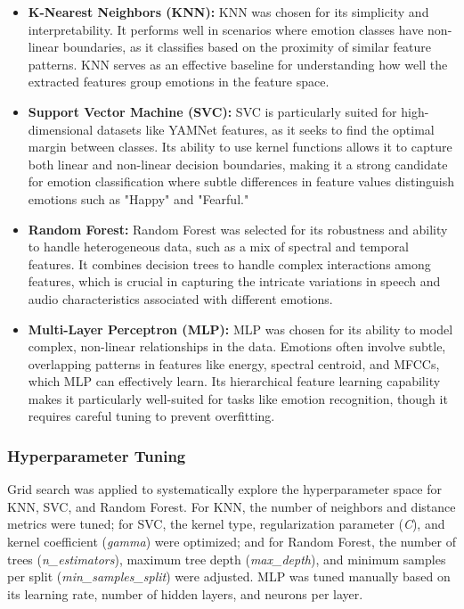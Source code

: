 \documentclass{article}
\begin{document}
\begin{itemize}
    \item \textbf{K-Nearest Neighbors (KNN):} 
    KNN was chosen for its simplicity and interpretability. It performs well in scenarios where emotion classes have 
    non-linear boundaries, as it classifies based on the proximity of similar feature patterns. KNN serves as an 
    effective baseline for understanding how well the extracted features group emotions in the feature space.

    \item \textbf{Support Vector Machine (SVC):} 
    SVC is particularly suited for high-dimensional datasets like YAMNet features, as it seeks to find the optimal 
    margin between classes. Its ability to use kernel functions allows it to capture both linear and non-linear decision 
    boundaries, making it a strong candidate for emotion classification where subtle differences in feature values 
    distinguish emotions such as "Happy" and "Fearful."

    \item \textbf{Random Forest:} 
    Random Forest was selected for its robustness and ability to handle heterogeneous data, such as a mix of spectral 
    and temporal features. It combines decision trees to handle complex interactions among features, which is crucial in 
    capturing the intricate variations in speech and audio characteristics associated with different emotions.

    \item \textbf{Multi-Layer Perceptron (MLP):} 
    MLP was chosen for its ability to model complex, non-linear relationships in the data. Emotions often involve subtle, 
    overlapping patterns in features like energy, spectral centroid, and MFCCs, which MLP can effectively learn. Its 
    hierarchical feature learning capability makes it particularly well-suited for tasks like emotion recognition, though 
    it requires careful tuning to prevent overfitting.
\end{itemize}

\subsubsection*{Hyperparameter Tuning}

Grid search was applied to systematically explore the hyperparameter space for KNN, SVC, and Random Forest. For KNN, the 
number of neighbors and distance metrics were tuned; for SVC, the kernel type, regularization parameter (\textit{C}), and 
kernel coefficient (\textit{gamma}) were optimized; and for Random Forest, the number of trees (\textit{n\_estimators}), 
maximum tree depth (\textit{max\_depth}), and minimum samples per split (\textit{min\_samples\_split}) were adjusted. 
MLP was tuned manually based on its learning rate, number of hidden layers, and neurons per layer.
\end{document}
